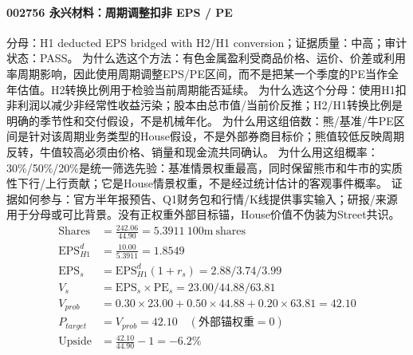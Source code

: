 \paragraph{002756 永兴材料：周期调整扣非 EPS / PE}
分母：H1 deducted EPS bridged with H2/H1 conversion；证据质量：中高；审计状态：PASS。
为什么选这个方法：有色金属盈利受商品价格、运价、价差或利用率周期影响，因此使用周期调整EPS/PE区间，而不是把某一个季度的PE当作全年估值。H2转换比例用于检验当前周期能否延续。
为什么选这个分母：使用H1扣非利润以减少非经常性收益污染；股本由总市值/当前价反推；H2/H1转换比例是明确的季节性和交付假设，不是机械年化。
为什么用这组倍数：熊/基准/牛PE区间是针对该周期业务类型的House假设，不是外部券商目标价；熊值较低反映周期反转，牛值较高必须由价格、销量和现金流共同确认。
为什么用这组概率：30\%/50\%/20\%是统一筛选先验：基准情景权重最高，同时保留熊市和牛市的实质性下行/上行贡献；它是House情景权重，不是经过统计估计的客观事件概率。
证据如何参与：官方半年报预告、Q1财务包和行情/K线提供事实输入；研报/来源用于分母或可比背景。没有正权重外部目标锚，House价值不伪装为Street共识。
\begin{align*}
\mathrm{Shares} &= \frac{242.06}{44.90}=5.3911\ \mathrm{100m\ shares}\\
\mathrm{EPS}_{H1}^d &= \frac{10.00}{5.3911}=1.8549\\
\mathrm{EPS}_s &= \mathrm{EPS}_{H1}^d(1+r_s)=2.88/3.74/3.99\\
V_s &= \mathrm{EPS}_s\times \mathrm{PE}_s=23.00/44.88/63.81\\
V_{prob} &= 0.30\times 23.00+0.50\times 44.88+0.20\times 63.81=42.10\\
P_{target} &= V_{prob}=42.10\quad(\text{外部锚权重}=0)\\
\mathrm{Upside} &= \frac{42.10}{44.90}-1=-6.2\%\\
\end{align*}

